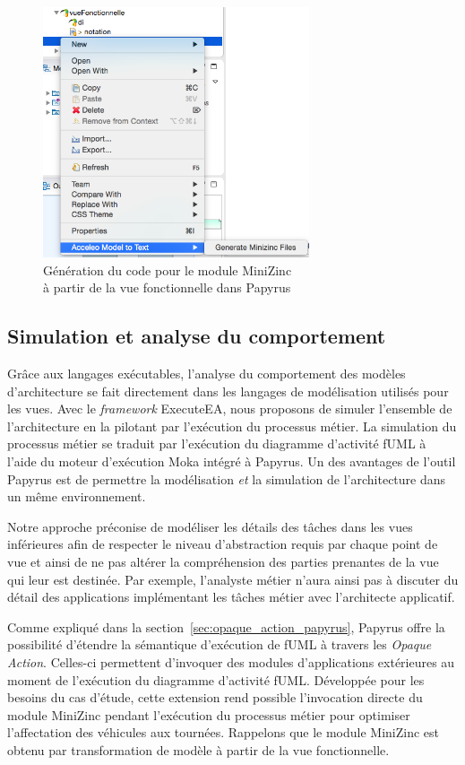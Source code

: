 \begin{figure}[!htbp]
  \centering
  \includegraphics[width=0.7\textwidth]{figures/5_implementation/acceleo_papyrus.png}
 \caption{Génération du code pour le module MiniZinc\\à partir de la vue fonctionnelle dans Papyrus}
 \label{fig:acceleo_papyrus}
\end{figure}


\subsection{Simulation et analyse du comportement}

Grâce aux langages exécutables, l'analyse du comportement des modèles
d'architecture se fait directement dans les langages de modélisation utilisés
pour les vues. Avec le \emph{framework} ExecuteEA, nous proposons de simuler
l'ensemble de l'architecture en la pilotant par l'exécution du processus métier.
La simulation du processus métier se traduit par l'exécution du diagramme
d'activité fUML à l'aide du moteur d'exécution Moka intégré à Papyrus. Un des
avantages de l'outil Papyrus est de permettre la modélisation \emph{et} la
simulation de l'architecture dans un même environnement.

Notre approche préconise de modéliser les détails des tâches dans les vues
inférieures afin de respecter le niveau d'abstraction requis par chaque point de
vue et ainsi de ne pas altérer la compréhension des parties prenantes de la vue
qui leur est destinée. Par exemple, l'analyste métier n'aura ainsi pas à discuter du
détail des applications implémentant les tâches métier avec l'architecte
applicatif.

Comme expliqué dans la section~\ref{sec:opaque_action_papyrus}, Papyrus offre la
possibilité d'étendre la sémantique d'exécution de fUML à travers les
\emph{Opaque Action}. Celles-ci permettent d'invoquer des modules d'applications
extérieures au moment de l'exécution du diagramme d'activité fUML.
Développée pour les besoins du cas d'étude, cette extension rend possible l'invocation directe
du module MiniZinc pendant l’exécution du processus métier pour optimiser
l'affectation des véhicules aux tournées. Rappelons que le module MiniZinc est
obtenu par transformation de modèle à partir de la vue fonctionnelle.

